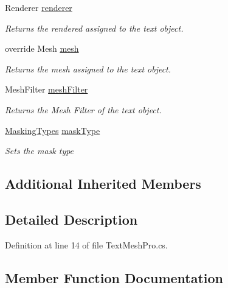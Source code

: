 \begin{DoxyCompactItemize}
Renderer \mbox{\hyperlink{class_t_m_pro_1_1_text_mesh_pro_a883e65b0b1fc2ea28d235a87c333ad71}{renderer}}
\begin{DoxyCompactList}\small\item\em Returns the rendered assigned to the text object. \end{DoxyCompactList}\item 
override Mesh \mbox{\hyperlink{class_t_m_pro_1_1_text_mesh_pro_a2d197f964234bb89563b06b4614168f5}{mesh}}
\begin{DoxyCompactList}\small\item\em Returns the mesh assigned to the text object. \end{DoxyCompactList}\item 
Mesh\+Filter \mbox{\hyperlink{class_t_m_pro_1_1_text_mesh_pro_a65b105c9a53bbcf8a45e19d1bbff146f}{mesh\+Filter}}
\begin{DoxyCompactList}\small\item\em Returns the Mesh Filter of the text object. \end{DoxyCompactList}\item 
\mbox{\hyperlink{namespace_t_m_pro_adca59e3caf7e75b8dfdcac4f70a31987}{Masking\+Types}} \mbox{\hyperlink{class_t_m_pro_1_1_text_mesh_pro_a9292c0fdebb6a1cdd791ced222eb5f89}{mask\+Type}}
\begin{DoxyCompactList}\small\item\em Sets the mask type \end{DoxyCompactList}\end{DoxyCompactItemize}
\subsection*{Additional Inherited Members}


\subsection{Detailed Description}


Definition at line 14 of file Text\+Mesh\+Pro.\+cs.



\subsection{Member Function Documentation}
\mbox{\label{class_t_m_pro_1_1_text_mesh_pro_a20da6ec1df3a80e5bdb11078b0175392}} 
